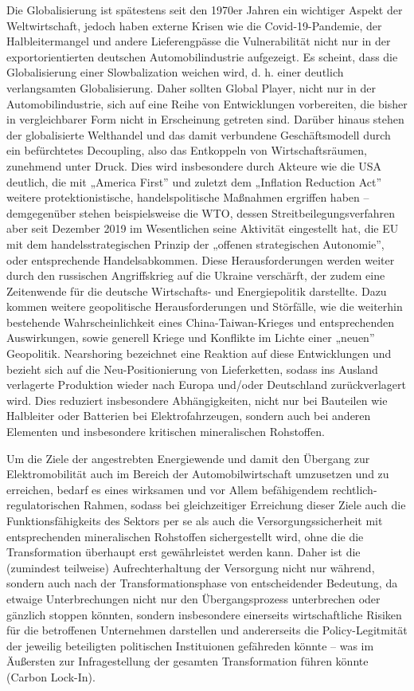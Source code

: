 \documentclass[12pt,a4paper,oneside]{book} %
\begin{document}
	Die Globalisierung ist spätestens seit den 1970er Jahren ein wichtiger Aspekt der Weltwirtschaft, jedoch haben externe Krisen wie die Covid-19-Pandemie, der Halbleitermangel und andere Lieferengpässe die Vulnerabilität nicht nur in der exportorientierten deutschen Automobilindustrie aufgezeigt. Es scheint, dass die Globalisierung einer Slowbalization weichen wird, d. h. einer deutlich verlangsamten Globalisierung. Daher sollten Global Player, nicht nur in der Automobilindustrie, sich auf eine Reihe von Entwicklungen vorbereiten, die bisher in vergleichbarer Form nicht in Erscheinung getreten sind.
	Darüber hinaus stehen der globalisierte Welthandel und das damit verbundene Geschäftsmodell durch ein befürchtetes Decoupling, also das Entkoppeln von Wirtschaftsräumen, zunehmend unter Druck. Dies wird insbesondere durch Akteure wie die USA deutlich, die mit „America First” und zuletzt dem „Inflation Reduction Act” weitere protektionistische, handelspolitische Maßnahmen ergriffen haben – demgegenüber stehen beispielsweise die WTO, dessen Streitbeilegungsverfahren aber seit Dezember 2019 im Wesentlichen seine Aktivität eingestellt hat, die EU mit dem handelsstrategischen Prinzip der „offenen strategischen Autonomie”, oder entsprechende Handelsabkommen. Diese Herausforderungen werden weiter durch den russischen Angriffskrieg auf die Ukraine verschärft, der zudem eine Zeitenwende für die deutsche Wirtschafts- und Energiepolitik darstellte. Dazu kommen weitere geopolitische Herausforderungen und Störfälle, wie die weiterhin bestehende Wahrscheinlichkeit eines China-Taiwan-Krieges und entsprechenden Auswirkungen, sowie generell Kriege und Konflikte im Lichte einer „neuen” Geopolitik. Nearshoring bezeichnet eine Reaktion auf diese Entwicklungen und bezieht sich auf die Neu-Positionierung von Lieferketten, sodass ins Ausland verlagerte Produktion wieder nach Europa und/oder Deutschland zurückverlagert wird. Dies reduziert insbesondere Abhängigkeiten, nicht nur bei Bauteilen wie Halbleiter oder Batterien bei Elektrofahrzeugen, sondern auch bei anderen Elementen und insbesondere kritischen mineralischen Rohstoffen.
	
	Um die Ziele der angestrebten Energiewende und damit den Übergang zur Elektromobilität auch im Bereich der Automobilwirtschaft umzusetzen und zu erreichen, bedarf es eines wirksamen und vor Allem befähigendem rechtlich-regulatorischen Rahmen, sodass bei gleichzeitiger Erreichung dieser Ziele auch die Funktionsfähigkeits des Sektors per se als auch die Versorgungssicherheit mit entsprechenden mineralischen Rohstoffen sichergestellt wird, ohne die die Transformation überhaupt erst gewährleistet werden kann. Daher ist die (zumindest teilweise) Aufrechterhaltung der Versorgung nicht nur während, sondern auch nach der Transformationsphase von entscheidender Bedeutung, da etwaige Unterbrechungen nicht nur den Übergangsprozess unterbrechen oder gänzlich stoppen könnten, sondern insbesondere einerseits wirtschaftliche Risiken für die betroffenen Unternehmen darstellen und andererseits die Policy-Legitmität der jeweilig beteiligten politischen Instituionen gefähreden könnte -- was im Äußersten zur Infragestellung der gesamten Transformation führen könnte (\glqq Carbon Lock-In\grqq).
	
\end{document}
